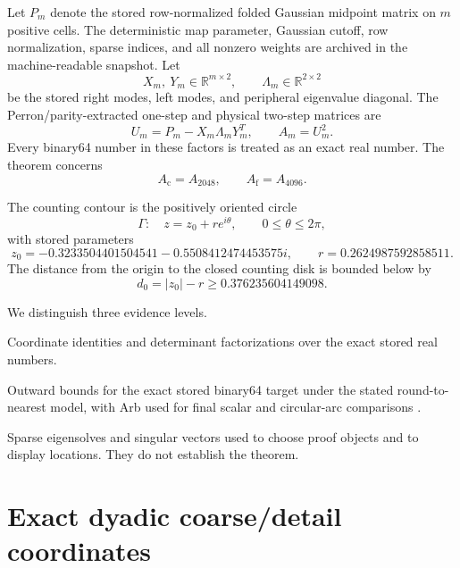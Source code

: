 \documentclass[11pt]{article}
\theoremstyle{definition}
\theoremstyle{remark}
\newcommand{\Ac}{A_{\mathrm c}}
\newcommand{\Af}{A_{\mathrm f}}
\newcommand{\GammaC}{\Gamma}
\begin{document}
Let \(P_m\) denote the stored row-normalized folded Gaussian midpoint matrix
on \(m\) positive cells.  The deterministic map parameter, Gaussian cutoff,
row normalization, sparse indices, and all nonzero weights are archived in
the machine-readable snapshot.  Let
\[
 X_m,\ Y_m\in\mathbb R^{m\times2},\qquad
 \Lambda_m\in\mathbb R^{2\times2}
\]
be the stored right modes, left modes, and peripheral eigenvalue diagonal.
The Perron/parity-extracted one-step and physical two-step matrices are
\begin{equation}
 U_m=P_m-X_m\Lambda_mY_m^{T},
 \qquad A_m=U_m^2.
 \label{eq:physical}
\end{equation}
Every binary64 number in these factors is treated as an exact real number.
The theorem concerns
\[
 \Ac=A_{2048},\qquad \Af=A_{4096}.
\]

The counting contour is the positively oriented circle
\begin{equation}
 \GammaC:\quad z=z_0+r e^{i\theta},\qquad 0\le\theta\le2\pi,
 \label{eq:contour}
\end{equation}
with stored parameters
\begin{equation}
 z_0=-0.3233504401504541-0.5508412474453575i,
 \qquad r=0.2624987592858511.
 \label{eq:contour-values}
\end{equation}
The distance from the origin to the closed counting disk is bounded below by
\begin{equation}
 d_0=|z_0|-r\ge0.376235604149098.
 \label{eq:origin-distance}
\end{equation}

We distinguish three evidence levels.
\begin{description}[leftmargin=2.7cm,style=nextline]
 \item[Exact algebra]
 Coordinate identities and determinant factorizations over the exact stored
 real numbers.
 \item[Rigorous certificate]
 Outward bounds for the exact stored binary64 target under the stated
 round-to-nearest model, with Arb used for final scalar and circular-arc
 comparisons \citep{Johansson2017,Rump2010}.
 \item[Floating diagnostic]
 Sparse eigensolves and singular vectors used to choose proof objects and to
 display locations.  They do not establish the theorem.
\end{description}

\section{Exact dyadic coarse/detail coordinates}
\label{sec:coordinates}
\end{document}
